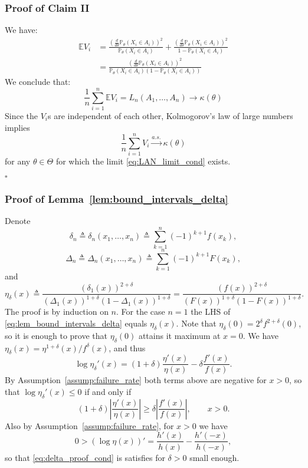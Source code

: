 \documentclass[letterpaper, 11pt]{IEEEtran}      %
\newcommand{\Prob}{\mathbb{P} }
\newcommand*{\QEDA}{\hfill\ensuremath{\square}}
\begin{document}
\subsubsection*{Proof of Claim II} 
We have:
\begin{align*}
\mathbb E V_i  & = 
 \frac{ \left(\frac{d}{d\theta} \Prob_{\theta}(X_i \in A_i) \right)^2}{\Prob_{\theta}(X_i \in A_i)}  
+ 
 \frac{ \left(\frac{d}{d\theta} \Prob_{\theta}(X_i \in A_i) \right)^2}{1-\Prob_{\theta}(X_i \in A_i)}  \\
 & = 
  \frac{ \left(\frac{d}{d\theta} \Prob_{\theta}(X_i \in A_i) \right)^2}{\Prob_{\theta}(X_i \in A_i) \left( 1-\Prob_{\theta}(X_i \in A_i) \right)}  
\end{align*}
 We conclude that:
\begin{equation} \label{eq:LAN_limit_cond}
\frac{1}{n} \sum_{i=1}^n \mathbb E V_i =   L_n(A_1,\ldots,A_n)  \to \kappa(\theta)
\end{equation}
Since the $V_i$s are independent of each other, Kolmogorov's law of large numbers implies
\[
\frac{1}{n} \sum_{i=1}^n  V_i \overset{a.s.}{\longrightarrow} \kappa(\theta)
\]
for any $\theta \in \Theta$ for which the limit \eqref{eq:LAN_limit_cond} exists.

\QEDA

\subsubsection*{Proof of Lemma~\ref{lem:bound_intervals_delta}} 
Denote 
\[
\delta_n \triangleq \delta_n(x_1,\ldots,x_n) \triangleq \sum_{k=1}^{n} (-1)^{k+1} f(x_k),
\]
\[
\Delta_n \triangleq \Delta_n(x_1,\ldots,x_n) \triangleq  \sum_{k=1}^n (-1)^{k+1} F(x_k),
\]
and 
\[
\eta_\delta(x) \triangleq  \frac{  \left(\delta_1(x) \right)^{2+\delta}}{  \left(\Delta_1(x)  \right)^{1+\delta}
(1-\Delta_1(x))^{1+\delta}}
= \frac{  \left( f (x) \right)^{2+\delta}}{ \left(F(x) \right)^{1+\delta}(1-F(x))^{1+\delta}}. 
\]
The proof is by induction on $n$. For the case $n=1$ the LHS of \eqref{eq:lem_bound_intervals_delta} equals $\eta_\delta(x)$. Note that $\eta_\delta(0) = 2^\delta f^{2+\delta}(0)$, so it is enough to prove that $\eta_\delta(0)$ attains it maximum at $x=0$. We have $\eta_\delta(x) = \eta^{1+\delta}(x)/f^\delta(x)$, and thus
\[
\log \eta_\delta'(x) = (1+\delta) \frac{\eta'(x)}{\eta(x)} - \delta \frac{f'(x)}{f(x)}. 
\]
By Assumption~\ref{assump:failure_rate} both terms above are negative for $x>0$, so that $\log \eta_\delta'(x) \leq 0$ if and only if
\begin{equation} \label{eq:delta_proof_cond}
(1+\delta) \left| \frac{\eta'(x)}{\eta(x)} \right| \geq \delta \left| \frac{f'(x)}{f(x)} \right|, \qquad x>0.
\end{equation}
Also by Assumption~\ref{assump:failure_rate}, for $x>0$ we have
\[
0 > (\log \eta(x))' = \frac{h'(x)}{h(x)}-\frac{h'(-x)}{h(-x)},
\]
so that \eqref{eq:delta_proof_cond} is satisfies for $\delta>0$ small enough. 
\end{document}
